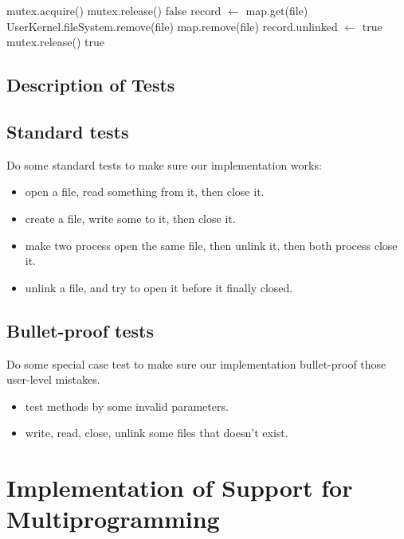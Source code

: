 \documentclass{article}
\begin{document}
	\begin{algorithm}[H]
		\begin{algorithmic}
			\State mutex.acquire()
			\State mutex.release()
			\State \Return false
			\Else
			\State record $\leftarrow$ map.get(file)
			\State UserKernel.fileSystem.remove(file)
			\State map.remove(file)
			\Else
			\State record.unlinked $\leftarrow$ true
			\EndIf
			\State mutex.release()
			\State \Return true
			\EndIf
			\EndProcedure
		\end{algorithmic}
	\end{algorithm}
	\subsection{Description of Tests}
	\subsection*{Standard tests}
	Do some standard tests to make sure our implementation works:
	
	\begin{itemize}
		\item open a file, read something from it, then close it.
		\item create a file, write some to it, then close it.
		\item make two process open the same file, then unlink it, then both process close it.
		\item unlink a file, and try to open it before it finally closed.
	\end{itemize}
	\subsection*{Bullet-proof tests}
	Do some special case test to make sure our implementation bullet-proof those user-level mistakes.
	
	\begin{itemize}
		\item test methods by some invalid parameters.
		\item write, read, close, unlink some files that doesn't exist.
	\end{itemize}

	\section{Implementation of Support for Multiprogramming}
\end{document}
